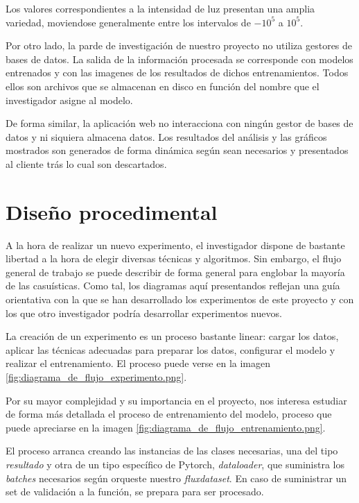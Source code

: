 Los valores correspondientes a la intensidad de luz presentan una amplia variedad, moviendose generalmente entre los intervalos de $-10^5$ a $10^5$. 


Por otro lado, la parde de investigación de nuestro proyecto no utiliza gestores de bases de datos. La salida de la información procesada se corresponde con modelos entrenados y con las imagenes de los resultados de dichos entrenamientos. Todos ellos son archivos que se almacenan en disco en función del nombre que el investigador asigne al modelo.

De forma similar, la aplicación web no interacciona con ningún gestor de bases de datos y ni siquiera almacena datos. Los resultados del análisis y las gráficos mostrados son generados de forma dinámica según sean necesarios y presentados al cliente trás lo cual son descartados.

\section{Diseño procedimental}

A la hora de realizar un nuevo experimento, el investigador dispone de bastante libertad a la hora de elegir diversas técnicas y algoritmos. Sin embargo, el flujo general de trabajo se puede describir de forma general para englobar la mayoría de las casuísticas. Como tal, los diagramas aquí presentandos reflejan una guía orientativa con la que se han desarrollado los experimentos de este proyecto y con los que otro investigador podría desarrollar experimentos nuevos.

La creación de un experimento es un proceso bastante linear: cargar los datos, aplicar las técnicas adecuadas para preparar los datos, configurar el modelo y realizar el entrenamiento. El proceso puede verse en la imagen  \ref{fig:diagrama_de_flujo_experimento.png}.


Por su mayor complejidad y su importancia en el proyecto, nos interesa estudiar de forma más detallada el proceso de entrenamiento del modelo, proceso que puede apreciarse en la imagen  \ref{fig:diagrama_de_flujo_entrenamiento.png}.

El proceso arranca creando las instancias de las clases necesarias, una del tipo \textit{resultado} y otra de un tipo específico de Pytorch, \textit{dataloader}, que suministra los \textit{batches} necesarios según orqueste nuestro \textit{fluxdataset}. En caso de suministrar un set de validación a la función, se prepara para ser procesado.

